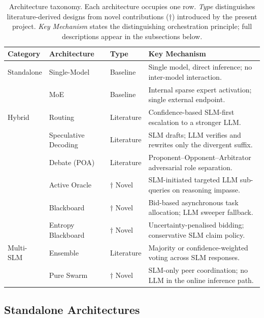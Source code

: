 \begin{table}[htbp]
\centering
\caption{Architecture taxonomy. Each architecture occupies one row. \emph{Type} distinguishes literature-derived designs from novel contributions ($\dagger$) introduced by the present project. \emph{Key Mechanism} states the distinguishing orchestration principle; full descriptions appear in the subsections below.}
\label{tab:architecture-taxonomy}
\small
\begin{tabularx}{\linewidth}{@{} l l l X @{}}
\toprule
\textbf{Category} & \textbf{Architecture} & \textbf{Type} & \textbf{Key Mechanism} \\
\midrule
Standalone & Single-Model         & Baseline         & Single model, direct inference; no inter-model interaction. \\
           & MoE                  & Baseline         & Internal sparse expert activation; single external endpoint. \\
\midrule
Hybrid     & Routing              & Literature       & Confidence-based SLM-first escalation to a stronger LLM. \\
           & Speculative Decoding & Literature       & SLM drafts; LLM verifies and rewrites only the divergent suffix. \\
           & Debate (POA)         & Literature       & Proponent--Opponent--Arbitrator adversarial role separation. \\
           & Active Oracle        & $\dagger$ Novel  & SLM-initiated targeted LLM sub-queries on reasoning impasse. \\
           & Blackboard           & $\dagger$ Novel  & Bid-based asynchronous task allocation; LLM sweeper fallback. \\
           & Entropy Blackboard   & $\dagger$ Novel  & Uncertainty-penalised bidding; conservative SLM claim policy. \\
\midrule
Multi-SLM  & Ensemble             & Literature       & Majority or confidence-weighted voting across SLM responses. \\
           & Pure Swarm           & $\dagger$ Novel  & SLM-only peer coordination; no LLM in the online inference path. \\
\bottomrule
\end{tabularx}
\end{table}

\subsection{Standalone Architectures}

